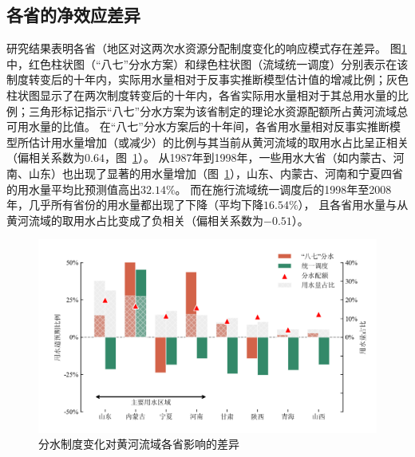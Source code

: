 \subsection{各省的净效应差异}\label{result-3}

研究结果表明各省（地区对这两次水资源分配制度变化的响应模式存在差异。
图\ref{fig:regulating}中，红色柱状图（“八七”分水方案）和绿色柱状图（流域统一调度）分别表示在该制度转变后的十年内，实际用水量相对于反事实推断模型估计值的增减比例；灰色柱状图显示了在两次制度转变后的十年内，各省实际用水量相对于其总用水量的比例；三角形标记指示“八七”分水方案为该省制定的理论水资源配额所占黄河流域总可用水量的比值。
在“八七”分水方案后的十年间，各省用水量相对反事实推断模型所估计用水量增加（或减少）的比例与其当前从黄河流域的取用水占比呈正相关（偏相关系数为$0.64$，图~\ref{fig:regulating}）。
从1987年到1998年，一些用水大省（如内蒙古、河南、山东）也出现了显著的用水量增加（图~\ref{fig:regulating}），山东、内蒙古、河南和宁夏四省的用水量平均比预测值高出$32.14\%$。
而在施行流域统一调度后的1998年至2008年，几乎所有省份的用水量都出现了下降（平均下降$16.54\%$），
且各省用水量与从黄河流域的取用水占比变成了负相关（偏相关系数为$-0.51$）。

\begin{figure}[!h]
	\includegraphics[width=\textwidth]{img/ch5/fig3.png}
	\caption[分水制度变化对黄河流域各省影响的差异]{分水制度变化对黄河流域各省影响的差异}\label{fig:regulating}
\end{figure}
